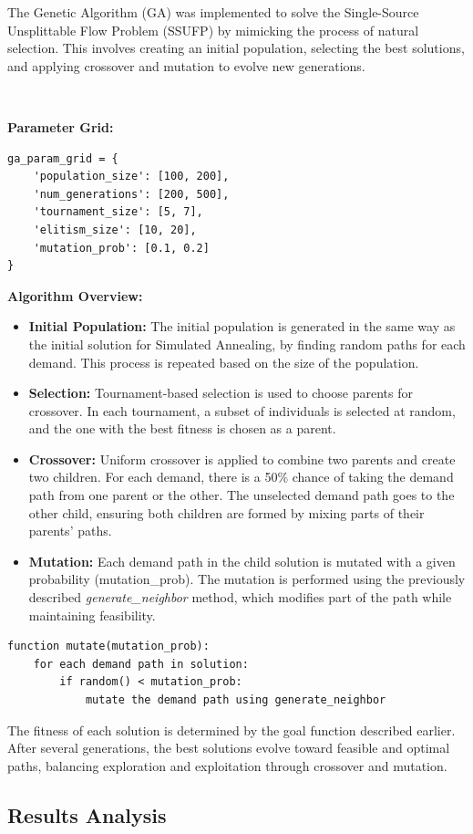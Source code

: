 \documentclass[a4paper,12pt]{article}
\begin{document}
The Genetic Algorithm (GA) was implemented to solve the Single-Source Unsplittable Flow Problem (SSUFP) by mimicking the process of natural selection. This involves creating an initial population, selecting the best solutions, and applying crossover and mutation to evolve new generations.

\

\noindent \textbf{Parameter Grid:}

\begin{verbatim}
ga_param_grid = {
    'population_size': [100, 200],
    'num_generations': [200, 500],
    'tournament_size': [5, 7],
    'elitism_size': [10, 20],
    'mutation_prob': [0.1, 0.2]
}
\end{verbatim}

\textbf{Algorithm Overview:}

\begin{itemize}
    \item \textbf{Initial Population:} The initial population is generated in the same way as the initial solution for Simulated Annealing, by finding random paths for each demand. This process is repeated based on the size of the population.
    
    \item \textbf{Selection:} Tournament-based selection is used to choose parents for crossover. In each tournament, a subset of individuals is selected at random, and the one with the best fitness is chosen as a parent.
    
    \item \textbf{Crossover:} Uniform crossover is applied to combine two parents and create two children. For each demand, there is a 50\% chance of taking the demand path from one parent or the other. The unselected demand path goes to the other child, ensuring both children are formed by mixing parts of their parents' paths.

    \item \textbf{Mutation:} Each demand path in the child solution is mutated with a given probability (mutation\_prob). The mutation is performed using the previously described \textit{generate\_neighbor} method, which modifies part of the path while maintaining feasibility.
\end{itemize}

\begin{verbatim}
function mutate(mutation_prob):
    for each demand path in solution:
        if random() < mutation_prob:
            mutate the demand path using generate_neighbor
\end{verbatim}

\noindent The fitness of each solution is determined by the goal function described earlier. After several generations, the best solutions evolve toward feasible and optimal paths, balancing exploration and exploitation through crossover and mutation.




\subsection{Results Analysis}

\end{document}
